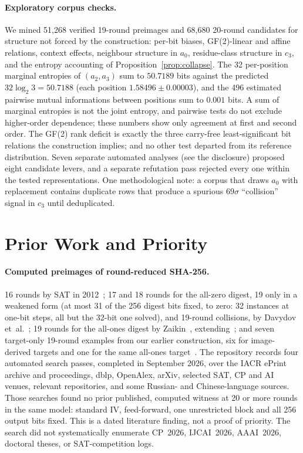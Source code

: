 \documentclass[11pt,a4paper]{article}
\begin{document}
\paragraph{Exploratory corpus checks.}
We mined 51{,}268 verified 19-round preimages and 68{,}680 20-round
candidates for structure not forced by the construction: per-bit biases,
GF(2)-linear and affine relations, context effects, neighbour structure in
$a_0$, residue-class structure in $c_3$, and the entropy accounting of
Proposition~\ref{prop:collapse}.  The 32 per-position marginal entropies of $(a_2,a_3)$ sum to $50.7189$ bits
against the predicted $32\log_2 3=50.7188$ (each position
$1.58496\pm0.00003$), and the 496 estimated pairwise mutual informations between
positions sum to $0.001$ bits.  A sum of marginal entropies is not the joint
entropy, and pairwise tests do not exclude higher-order dependence; these
numbers show only agreement at first and second order.  The GF(2) rank deficit is exactly the three carry-free least-significant
bit relations the construction implies; and no other test departed from its
reference distribution.  Seven separate automated analyses (see the
disclosure) proposed eight candidate levers, and a separate refutation pass
rejected every one within the tested representations.  One methodological note: a corpus that
draws $a_0$ with replacement contains duplicate rows that produce a spurious
$69\sigma$ ``collision'' signal in $c_3$ until deduplicated.

\section{Prior Work and Priority}
\label{sec:priority}

\paragraph{Computed preimages of round-reduced SHA-256.}
16 rounds by SAT in 2012~\cite{Homsirikamol2012}; 17 and 18 rounds for the
all-zero digest, 19 only in a weakened form (at most 31 of the 256 digest bits fixed, to
zero: 32 instances at one-bit steps, all but the 32-bit one solved), and
19-round collisions, by Davydov et~al.~\cite{Davydov2025}; 19 rounds for the
all-ones digest by Zaikin~\cite{Zaikin2026}, extending~\cite{Zaikin2024CP,
Zaikin2024JAIR}; and seven target-only 19-round examples from our earlier
construction, six for image-derived targets and one for the same
all-ones target~\cite{Basra2026R19}.  The repository records four automated
search passes, completed in September 2026, over the IACR ePrint archive and
proceedings, dblp, OpenAlex, arXiv, selected SAT, CP and AI venues, relevant
repositories, and some Russian- and Chinese-language sources.  Those searches
found no prior published, computed witness at 20 or more rounds in the same
model: standard IV, feed-forward, one unrestricted block and all 256 output
bits fixed.  This is a dated literature finding, not a proof of priority.  The
search did not systematically enumerate CP~2026, IJCAI~2026, AAAI~2026,
doctoral theses, or SAT-competition logs.
\end{document}
